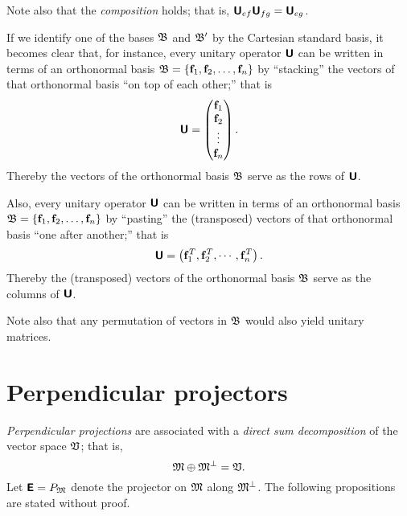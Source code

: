Note also that the {\em composition} holds; that is, $\textsf{\textbf{U}}_{ef} \textsf{\textbf{U}}_{fg}=  \textsf{\textbf{U}}_{eg}$.



If we
identify one of the bases  ${\frak B}$ and ${\frak B}'$ by the Cartesian standard basis,
it becomes clear that, for instance,
every unitary operator  $\textsf{\textbf{U}}$  can be written in terms of an orthonormal basis
${\frak B}=\{{\bf f}_1,  {\bf f}_2, \ldots , {\bf f}_n\}$
by ``stacking'' the vectors of that orthonormal basis ``on top of each other;''
that is
\begin{equation}
\textsf{\textbf{U}}=
\begin{pmatrix}
{\bf f}_1\\
{\bf f}_2\\
\vdots\\
{\bf f}_n
\end{pmatrix}
.
\end{equation}
Thereby the vectors of the orthonormal basis  ${\frak B}$ serve as the
rows of $\textsf{\textbf{U}}$.

Also, every unitary operator  $\textsf{\textbf{U}}$  can be written in terms of an orthonormal basis
${\frak B}=\{{\bf f}_1,  {\bf f}_2, \ldots , {\bf f}_n\}$
by ``pasting'' the (transposed) vectors of that orthonormal basis ``one after another;''
that is
\begin{equation}
\textsf{\textbf{U}}= \left(
{\bf f}_1^T,
{\bf f}_2^T,
\cdots,
{\bf f}_n^T
\right).
\end{equation}
Thereby the (transposed) vectors of the orthonormal basis  ${\frak B}$ serve as the
columns of $\textsf{\textbf{U}}$.

Note also that any permutation of vectors in ${\frak B}$ would also yield unitary matrices.







\section{Perpendicular projectors}

{\em Perpendicular projections}
are associated with a {\em direct sum decomposition} of the vector space ${\frak V}$;
that is,
\begin{equation}
 {\frak M}\oplus {\frak M}^\perp ={\frak V}.
\label{2012-m-ch-fdvs-perp}
\end{equation}
Let $\textsf{\textbf{E}}=P_{\frak M}$ denote the projector on ${\frak M}$
along ${\frak M}^\perp$.  The following propositions are stated without proof.



